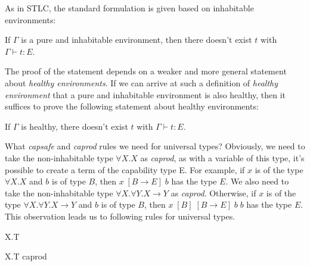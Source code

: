 As in STLC, the standard formulation is given based on inhabitable
environments:

\begin{definition}
  If $\Gamma$ is a pure and inhabitable environment, then there
  doesn't exist $t$ with $\Gamma \vdash t : E$.
\end{definition}

The proof of the statement depends on a weaker and more general
statement about \emph{healthy environments}. If we can arrive at such
a definition of \emph{healthy environment} that a pure and inhabitable
environment is also healthy, then it suffices to prove the following
statement about healthy environments:

\begin{definition}
  If $\Gamma$ is healthy, there doesn't exist $t$ with
  $\Gamma \vdash t : E$.
\end{definition}

What \emph{capsafe} and \emph{caprod} rules we need for universal
types? Obviously, we need to take the non-inhabitable type
$\forall X.X$ as \emph{caprod}, as with a variable of this type, it's
possible to create a term of the capability type E. For example, if
$x$ is of the type $\forall X.X$ and $b$ is of type $B$, then
$x \; [B \to E] \; b$ has the type $E$.  We also need to take the
non-inhabitable type $\forall X. \forall Y. X \to Y$ as
\emph{caprod}. Otherwise, if $x$ is of the type
$\forall X. \forall Y. X \to Y$ and $b$ is of type $B$, then
$x \; [B] \; [B \to E] \; b \; b$ has the type $E$. This observation
leads us to following rules for universal types.

{ \forall X.T \quad {} }

{ \forall X.T \quad caprod }


